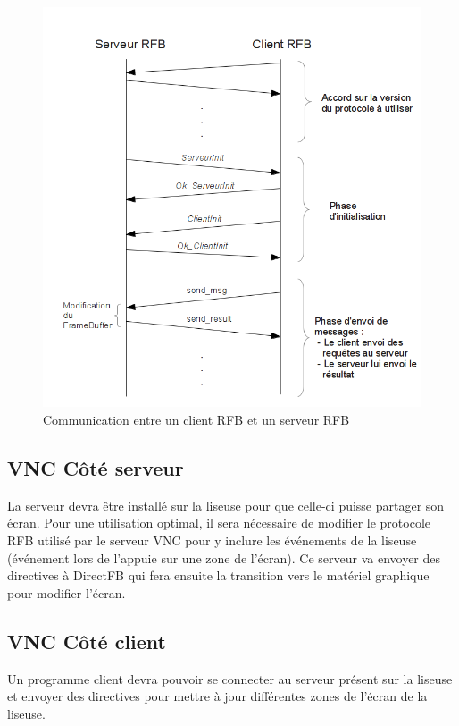 \begin{figure}[h!]
	\begin{center}
		\includegraphics[scale=0.6]{RFBProtocol.png}
		\caption{Communication entre un client RFB et un serveur RFB}
	\end{center}
\end{figure}

\subsection{VNC Côté serveur}

La serveur devra être installé sur la liseuse pour que celle-ci puisse partager son écran. Pour une utilisation optimal, il sera nécessaire de modifier le protocole RFB utilisé par le serveur VNC pour y inclure les événements de la liseuse (événement lors de l'appuie sur une zone de l'écran). Ce serveur va envoyer des directives à DirectFB qui fera ensuite la transition vers le matériel graphique pour modifier l'écran.

\subsection{VNC Côté client}

Un programme client devra pouvoir se connecter au serveur présent sur la liseuse et envoyer des directives pour mettre à jour différentes zones de l'écran de la liseuse.

